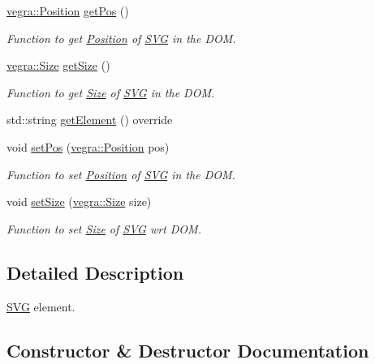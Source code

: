 \begin{DoxyCompactItemize}
\mbox{\hyperlink{structvegra_1_1Position}{vegra\+::\+Position}} \mbox{\hyperlink{structvegra_1_1SVG_a6d7a82c399cdf3ea7e078b66a8bbf024}{get\+Pos}} ()
\begin{DoxyCompactList}\small\item\em Function to get \mbox{\hyperlink{structvegra_1_1Position}{Position}} of \mbox{\hyperlink{structvegra_1_1SVG}{S\+VG}} in the D\+OM. \end{DoxyCompactList}\item 
\mbox{\hyperlink{structvegra_1_1Size}{vegra\+::\+Size}} \mbox{\hyperlink{structvegra_1_1SVG_ad1b80e84f2eeccbbf7c039812f6c35fa}{get\+Size}} ()
\begin{DoxyCompactList}\small\item\em Function to get \mbox{\hyperlink{structvegra_1_1Size}{Size}} of \mbox{\hyperlink{structvegra_1_1SVG}{S\+VG}} in the D\+OM. \end{DoxyCompactList}\item 
std\+::string \mbox{\hyperlink{structvegra_1_1SVG_aec9681b5ca49e9cdd48297677b18151b}{get\+Element}} () override
\item 
void \mbox{\hyperlink{structvegra_1_1SVG_a6468964d098acbdd91da3cac55e6f6b8}{set\+Pos}} (\mbox{\hyperlink{structvegra_1_1Position}{vegra\+::\+Position}} pos)
\begin{DoxyCompactList}\small\item\em Function to set \mbox{\hyperlink{structvegra_1_1Position}{Position}} of \mbox{\hyperlink{structvegra_1_1SVG}{S\+VG}} in the D\+OM. \end{DoxyCompactList}\item 
void \mbox{\hyperlink{structvegra_1_1SVG_ad80b2990559293806eeb8223bb7a8dc4}{set\+Size}} (\mbox{\hyperlink{structvegra_1_1Size}{vegra\+::\+Size}} size)
\begin{DoxyCompactList}\small\item\em Function to set \mbox{\hyperlink{structvegra_1_1Size}{Size}} of \mbox{\hyperlink{structvegra_1_1SVG}{S\+VG}} wrt D\+OM. \end{DoxyCompactList}\end{DoxyCompactItemize}


\subsection{Detailed Description}
\mbox{\hyperlink{structvegra_1_1SVG}{S\+VG}} element. 

\subsection{Constructor \& Destructor Documentation}
\mbox{\label{structvegra_1_1SVG_a3fd44691284da36fbf659b230e870950}} 
